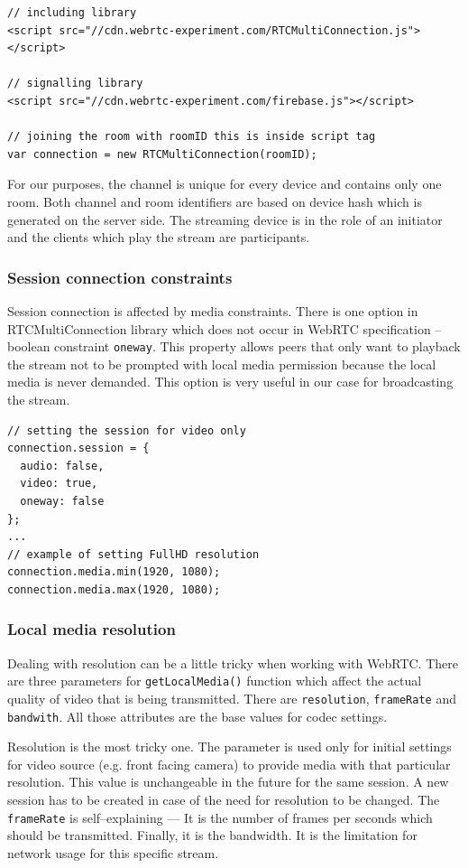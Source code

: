 \begin{lstlisting}
// including library
<script src="//cdn.webrtc-experiment.com/RTCMultiConnection.js">
</script>

// signalling library
<script src="//cdn.webrtc-experiment.com/firebase.js"></script>

// joining the room with roomID this is inside script tag
var connection = new RTCMultiConnection(roomID);
\end{lstlisting}

For our purposes, the channel is unique for every device and contains only one room. Both channel and room identifiers are based on device hash which is generated on the server side. The streaming device is in the role of an initiator and the clients which play the stream are participants.


\subsubsection{Session connection constraints}
Session connection is affected by media constraints. There is one option in RTCMultiConnection library which does not occur in WebRTC specification -- boolean constraint \verb!oneway!. This property allows peers that only want to playback the stream not to be prompted with local media permission because the local media is never demanded. This option is very useful in our case for broadcasting the stream.

\begin{lstlisting}
// setting the session for video only
connection.session = {
  audio: false,
  video: true,
  oneway: false
};
...
// example of setting FullHD resolution
connection.media.min(1920, 1080);
connection.media.max(1920, 1080);
\end{lstlisting}

\subsubsection{Local media resolution}
Dealing with resolution can be a little tricky when working with WebRTC. There are three parameters for \verb!getLocalMedia()! function which affect the actual quality of video that is being transmitted. There are \verb!resolution!, \verb!frameRate! and \verb!bandwith!. All those attributes are the base values for codec settings.

Resolution is the most tricky one. The parameter is used only for initial settings for video source (e.g. front facing camera) to provide media with that particular resolution. This value is unchangeable in the future for the same session. A new session has to be created in case of the need for resolution to be changed. The \verb!frameRate! is self--explaining --- It is the number of frames per seconds which should be transmitted. Finally, it is the bandwidth. It is the limitation for network usage for this specific stream.


